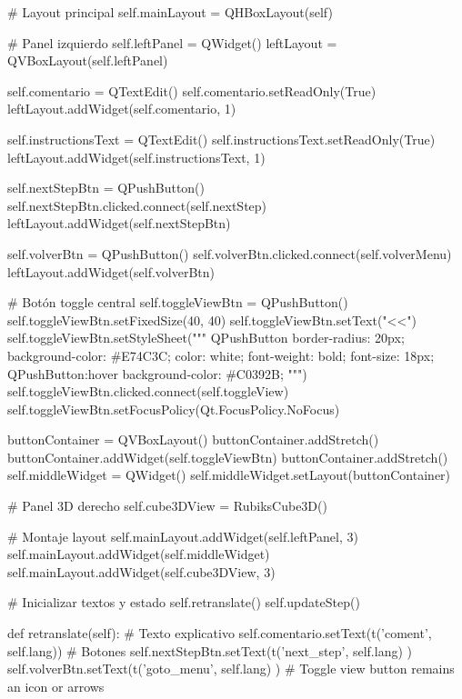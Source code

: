         # Layout principal
        self.mainLayout = QHBoxLayout(self)

        # Panel izquierdo
        self.leftPanel = QWidget()
        leftLayout = QVBoxLayout(self.leftPanel)

        self.comentario = QTextEdit()
        self.comentario.setReadOnly(True)
        leftLayout.addWidget(self.comentario, 1)

        self.instructionsText = QTextEdit()
        self.instructionsText.setReadOnly(True)
        leftLayout.addWidget(self.instructionsText, 1)

        self.nextStepBtn = QPushButton()
        self.nextStepBtn.clicked.connect(self.nextStep)
        leftLayout.addWidget(self.nextStepBtn)

        self.volverBtn = QPushButton()
        self.volverBtn.clicked.connect(self.volverMenu)
        leftLayout.addWidget(self.volverBtn)

        # Botón toggle central
        self.toggleViewBtn = QPushButton()
        self.toggleViewBtn.setFixedSize(40, 40)
        self.toggleViewBtn.setText("<<")
        self.toggleViewBtn.setStyleSheet("""
            QPushButton { border-radius: 20px; background-color: #E74C3C;
                         color: white; font-weight: bold; font-size: 18px; }
            QPushButton:hover { background-color: #C0392B; }
        """)
        self.toggleViewBtn.clicked.connect(self.toggleView)
        self.toggleViewBtn.setFocusPolicy(Qt.FocusPolicy.NoFocus)

        buttonContainer = QVBoxLayout()
        buttonContainer.addStretch()
        buttonContainer.addWidget(self.toggleViewBtn)
        buttonContainer.addStretch()
        self.middleWidget = QWidget()
        self.middleWidget.setLayout(buttonContainer)

        # Panel 3D derecho
        self.cube3DView = RubiksCube3D()

        # Montaje layout
        self.mainLayout.addWidget(self.leftPanel, 3)
        self.mainLayout.addWidget(self.middleWidget)
        self.mainLayout.addWidget(self.cube3DView, 3)

        # Inicializar textos y estado
        self.retranslate()
        self.updateStep()

    def retranslate(self):
        # Texto explicativo
        self.comentario.setText(t('coment', self.lang))
        # Botones
        self.nextStepBtn.setText(t('next_step', self.lang) )
        self.volverBtn.setText(t('goto_menu', self.lang) )
        # Toggle view button remains an icon or arrows

